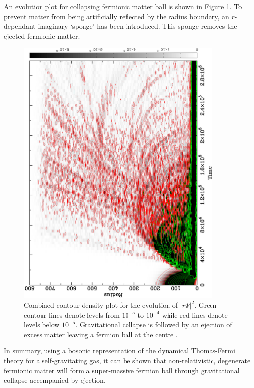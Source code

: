 An evolution plot for collapsing fermionic matter ball is shown in Figure \ref{fig_robert}.
To prevent matter from being artificially reflected by the radius boundary, an $r$-dependant imaginary `sponge' has been introduced.
This sponge removes the ejected fermionic matter.
\begin{figure}[t]
	\begin{center}
	\includegraphics[angle=-90,width=0.9\textwidth]{eps/robert.eps}
	\caption{Combined contour-density plot for the evolution of $|r \Psi |^{2}$. Green contour lines denote levels from
	$10^{-5}$ to $10^{-4}$ while red lines denote levels below $10^{-5}$.
	Gravitational collapse is followed by an ejection of excess matter leaving a fermion ball at the centre
	\cite{ref_formation}.}
	\label{fig_robert}
	\end{center}
\end{figure}

In summary, using a bosonic representation of the dynamical Thomas-Fermi theory for a self-gravitating gas, it can be shown that
non-relativistic, degenerate fermionic matter will form a super-massive fermion ball through gravitational collapse accompanied by ejection.
